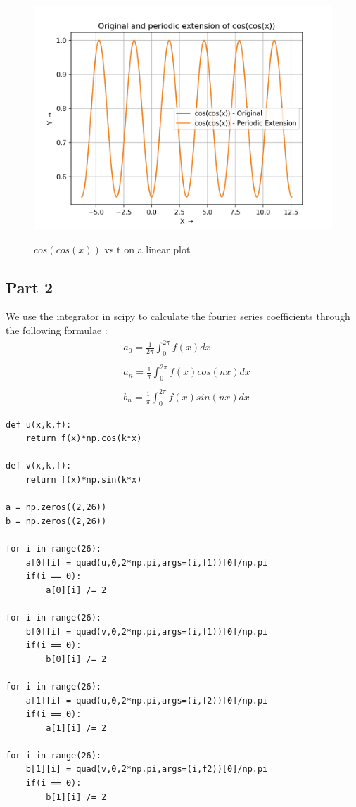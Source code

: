 \documentclass[11pt, a4paper]{article}
\begin{document}
\begin{figure}[H]
   	\centering
   	\includegraphics[scale=0.5]{coscos.png}
   	\label{fig:coscos}
   	\caption{$cos(cos(x))$ vs t on a linear plot}
\end{figure}

\subsection{Part 2}
We use the integrator in scipy to calculate the fourier series coefficients through the following formulae :
\begin{equation} \label{eq:1}
\begin{aligned}
&a_0 = \frac{1}{2\pi}\int_{0}^{2\pi} f(x) dx \\ \\
&a_n = \frac{1}{\pi}\int_{0}^{2\pi} f(x)cos(nx) dx \\ \\
&b_n = \frac{1}{\pi}\int_{0}^{2\pi} f(x)sin(nx) dx
\end{aligned}
\end{equation}
\begin{verbatim}
def u(x,k,f):
	return f(x)*np.cos(k*x)

def v(x,k,f):
	return f(x)*np.sin(k*x)

a = np.zeros((2,26))
b = np.zeros((2,26))

for i in range(26):
	a[0][i] = quad(u,0,2*np.pi,args=(i,f1))[0]/np.pi
	if(i == 0):
		a[0][i] /= 2

for i in range(26):
	b[0][i] = quad(v,0,2*np.pi,args=(i,f1))[0]/np.pi
	if(i == 0):
		b[0][i] /= 2

for i in range(26):
	a[1][i] = quad(u,0,2*np.pi,args=(i,f2))[0]/np.pi
	if(i == 0):
		a[1][i] /= 2

for i in range(26):
	b[1][i] = quad(v,0,2*np.pi,args=(i,f2))[0]/np.pi
	if(i == 0):
		b[1][i] /= 2
\end{verbatim}
\end{document}
